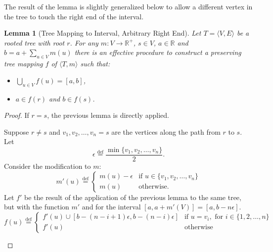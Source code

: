\documentclass{article}
\newtheorem*{lemma}{Lemma}
\newcommand{\R}{\mathbb{R}}
\newcommand{\eqdef}{\stackrel{\text{def}}{=}}
\begin{document}
The result of the lemma is slightly generalized below to allow a different vertex in the tree to touch the right end of the interval.
\begin{lemma}[Tree Mapping to Interval, Arbitrary Right End]
    Let $T = \langle V, E \rangle$ be a rooted tree with root $r$. For any $m : V \rightarrow \R^+$, $s \in V$, $a \in \R$ and $b = a + \sum_{u \in V}m(u)$ there is an effective procedure to construct a preserving tree mapping $f$ of $\langle T, m \rangle$ such that:
  \begin{itemize}
  \item $\bigcup_{u \in V}f(u) = [a, b]$,
  \item $a \in f(r)$ and $b \in f(s)$.
  \end{itemize}
\end{lemma}
\begin{proof}
  If $r = s$, the previous lemma is directly applied.

  Suppose $r \neq s$ and $v_1, v_2, \dots, v_n = s$ are the vertices along the path from $r$ to $s$. Let
  \begin{equation*}
    \epsilon \eqdef \frac{\min\{v_1, v_2, \dots, v_n\}}{2}.
  \end{equation*}
  Consider the modification to $m$:
  \begin{equation*}
    m'(u) \eqdef
    \begin{cases}
      m(u) - \epsilon & \text{if } u \in \{v_1, v_2, \dots, v_n\} \\
      m(u) & \text{otherwise.}
    \end{cases}
  \end{equation*}
  Let $f'$ be the result of the application of the previous lemma to the same tree, but with the function $m'$ and for the interval $[a, a + m'(V)] = [a, b - n\epsilon]$.
  \begin{equation*}
    f(u) \eqdef
    \begin{cases}
      f'(u) \cup [b - (n - i + 1)\epsilon, b - (n - i)\epsilon] & \text{if } u = v_i, \text{ for } i \in \{1, 2, \dots, n\} \\
      f'(u) & \text{otherwise}
    \end{cases}
  \end{equation*}
  \begin{figure}[ht]
    \centering
\end{figure}
\end{proof}
\end{document}
